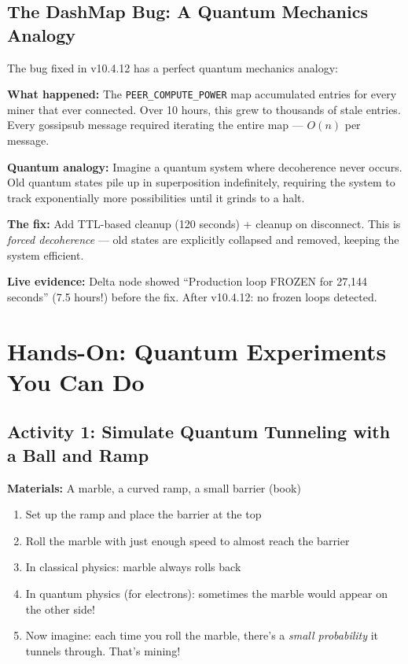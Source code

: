 \documentclass[11pt,a4paper]{article}
\begin{document}
\subsection{The DashMap Bug: A Quantum Mechanics Analogy}

The bug fixed in v10.4.12 has a perfect quantum mechanics analogy:

\begin{tcolorbox}[colback=energyred!10,colframe=energyred,title=\textbf{The Bug as Quantum Decoherence Failure}]
\textbf{What happened:} The \texttt{PEER\_COMPUTE\_POWER} map accumulated entries for every miner that ever connected. Over 10 hours, this grew to thousands of stale entries. Every gossipsub message required iterating the entire map --- $O(n)$ per message.

\textbf{Quantum analogy:} Imagine a quantum system where decoherence never occurs. Old quantum states pile up in superposition indefinitely, requiring the system to track exponentially more possibilities until it grinds to a halt.

\textbf{The fix:} Add TTL-based cleanup (120 seconds) + cleanup on disconnect. This is \textit{forced decoherence} --- old states are explicitly collapsed and removed, keeping the system efficient.

\textbf{Live evidence:} Delta node showed ``Production loop FROZEN for 27,144 seconds'' (7.5 hours!) before the fix. After v10.4.12: no frozen loops detected.
\end{tcolorbox}

\section{Hands-On: Quantum Experiments You Can Do}

\subsection{Activity 1: Simulate Quantum Tunneling with a Ball and Ramp}

\textbf{Materials:} A marble, a curved ramp, a small barrier (book)

\begin{enumerate}
    \item Set up the ramp and place the barrier at the top
    \item Roll the marble with just enough speed to almost reach the barrier
    \item In classical physics: marble always rolls back
    \item In quantum physics (for electrons): sometimes the marble would appear on the other side!
    \item Now imagine: each time you roll the marble, there's a \textit{small probability} it tunnels through. That's mining!
\end{enumerate}
\end{document}
